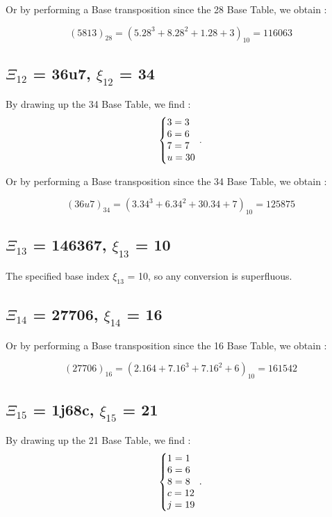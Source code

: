 \documentclass[letterpaper,10pt,english]{sphinxmanual}
\begin{document}
\begin{flushleft}
  Or by performing a Base transposition since the 28 Base Table, we obtain :
\end{flushleft}
\begin{equation}
(5813)_{28}=(5.28^{3}+8.28^{2}+1.28+3)_{10}=116 063
\end{equation}

\subsection{$\Xi_{12}$ = 36u7, $\xi_{12}$ = 34}
By drawing up the 34 Base Table, we find :
\begin{equation}
\centering
\left\{\begin{array}{@{}l@{}}
3=3 \\
6=6 \\
7=7 \\
u=30 \\
\end{array}\right.\,.
\end{equation}

\begin{flushleft}
  Or by performing a Base transposition since the 34 Base Table, we obtain :
\end{flushleft}
\begin{equation}
(36u7)_{34}=(3.34^{3}+6.34^{2}+30.34+7)_{10}=125 875
\end{equation}

\subsection{$\Xi_{13}$ = 146367, $\xi_{13}$ = 10}
The specified base index $\xi_{13}$ = 10, so any conversion is superfluous.

\subsection{$\Xi_{14}$ = 27706, $\xi_{14}$ = 16}

\begin{flushleft}
  Or by performing a Base transposition since the 16 Base Table, we obtain :
\end{flushleft}
\begin{equation}
(27706)_{16}=(2.16{4}+7.16^{3}+7.16^{2}+6)_{10}=161542
\end{equation}

\subsection{$\Xi_{15}$ = 1j68c, $\xi_{15}$ = 21}
By drawing up the 21 Base Table, we find :
\begin{equation}
\centering
\left\{\begin{array}{@{}l@{}}
1=1 \\
6=6 \\
8=8 \\
c=12 \\
j=19 \\
\end{array}\right.\,.
\end{equation}
\end{document}
